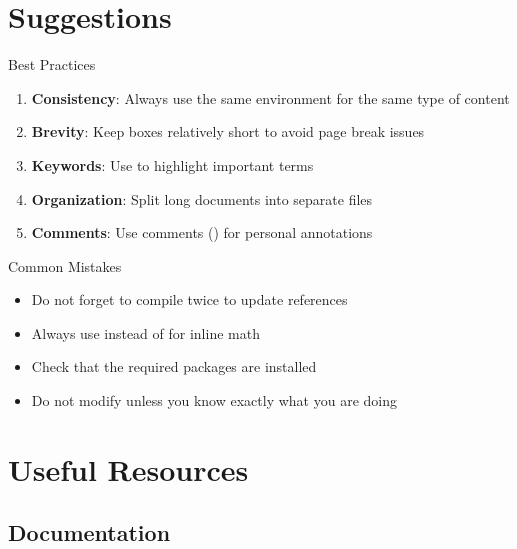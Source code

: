\documentclass[]{csnotes}
\begin{document}

\section{Suggestions}

\begin{note}{Best Practices}
\begin{enumerate}
    \item \textbf{Consistency}: Always use the same environment for the same type of content
    \item \textbf{Brevity}: Keep boxes relatively short to avoid page break issues
    \item \textbf{Keywords}: Use  to highlight important terms
    \item \textbf{Organization}: Split long documents into separate files
    \item \textbf{Comments}: Use comments (\code{\%}) for personal annotations
\end{enumerate}
\end{note}

\begin{warning}{Common Mistakes}
\begin{itemize}
    \item Do not forget to compile twice to update references
    \item Always use  instead of  for inline math
    \item Check that the required packages are installed
    \item Do not modify  unless you know exactly what you are doing
\end{itemize}
\end{warning}


\section{Useful Resources}

\subsection{Documentation}
\end{document}

